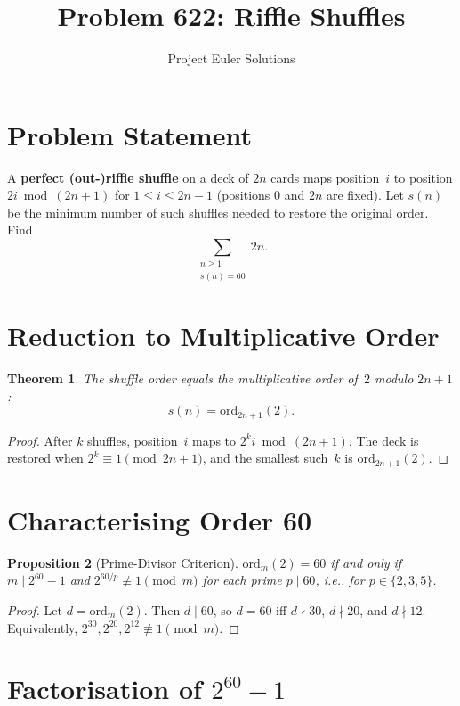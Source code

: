 \documentclass[11pt]{article}
\title{Problem 622: Riffle Shuffles}
\author{Project Euler Solutions}
\date{}
\newtheorem{theorem}{Theorem}
\newtheorem{proposition}[theorem]{Proposition}
\begin{document}
\maketitle

\section{Problem Statement}

A \textbf{perfect (out-)riffle shuffle} on a deck of $2n$ cards maps position~$i$ to position $2i \bmod (2n+1)$ for $1 \le i \le 2n-1$ (positions 0 and $2n$ are fixed). Let $s(n)$ be the minimum number of such shuffles needed to restore the original order. Find
\[
\sum_{\substack{n \ge 1 \\ s(n) = 60}} 2n.
\]

\section{Reduction to Multiplicative Order}

\begin{theorem}
The shuffle order equals the multiplicative order of~$2$ modulo $2n+1$:
\[
s(n) = \mathrm{ord}_{2n+1}(2).
\]
\end{theorem}

\begin{proof}
After $k$ shuffles, position~$i$ maps to $2^k i \bmod (2n+1)$. The deck is restored when $2^k \equiv 1 \pmod{2n+1}$, and the smallest such~$k$ is $\mathrm{ord}_{2n+1}(2)$.
\end{proof}

\section{Characterising Order 60}

\begin{proposition}[Prime-Divisor Criterion]
\label{prop:order}
$\mathrm{ord}_m(2) = 60$ if and only if $m \mid 2^{60} - 1$ and $2^{60/p} \not\equiv 1 \pmod{m}$ for each prime $p \mid 60$, i.e., for $p \in \{2, 3, 5\}$.
\end{proposition}

\begin{proof}
Let $d = \mathrm{ord}_m(2)$. Then $d \mid 60$, so $d = 60$ iff $d \nmid 30$, $d \nmid 20$, and $d \nmid 12$. Equivalently, $2^{30}, 2^{20}, 2^{12} \not\equiv 1 \pmod{m}$.
\end{proof}

\section{Factorisation of $2^{60} - 1$}
\end{document}
